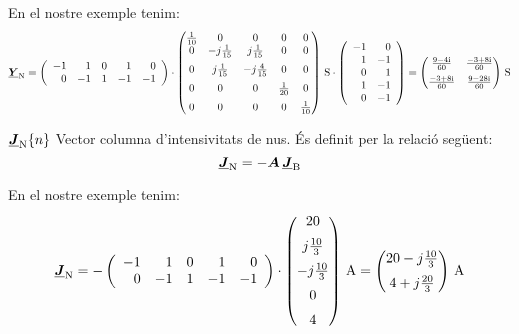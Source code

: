 \begin{list}{}
   En el nostre exemple tenim:
   {\fontsize{10pt}{10pt}\selectfont
   \[
      \mcmplx{Y}\ped{N} =
      \left(\begin{array}{rrrrr} -1 & 1  & 0 &  1 & 0 \\  0 & -1 & 1 & -1 & -1
      \end{array}\right) \cdot
      \begin{pmatrix}
            \frac{1}{10} & 0 & 0 & 0 & 0 \\
            0 & -j\frac{1}{15} & j\frac{1}{15} & 0 & 0 \\[2mm]
            0 & j\frac{1}{15} & -j\frac{4}{15} & 0 & 0 \\[2mm]
            0 & 0 & 0 & \frac{1}{20} & 0 \\[2mm]
            0 & 0 & 0 & 0 & \frac{1}{10}
      \end{pmatrix}\,\unit{S} \cdot
      \left(\begin{array}{rr} -1 & 0 \\ 1  & -1 \\  0 & 1 \\ 1 & -1 \\ 0 & -1
      \end{array}\right)
       =
      \begin{pmatrix}
            \frac{\complexnum{9 - j 4}}{60} & \frac{\complexnum{-3 + j 8}}{60} \\[2mm]
            \frac{\complexnum{-3 + j 8}}{60} & \frac{\complexnum{9 - j 28}}{60}
      \end{pmatrix}\,\unit{S}
      \label{eq:yn}
   \]}

   \item[$\underline{\boldsymbol{J}}_\mathrm{N}\{n\}$] Vector columna d'intensivitats de nus. És definit per la relació següent:
   \begin{equation}
      \underline{\boldsymbol{J}}_\mathrm{N} = - \boldsymbol{A} \,\underline{\boldsymbol{J}}_\mathrm{B}
   \end{equation}

   En el nostre exemple tenim:
   \[
      \mcmplx{J}\ped{N} = -
      \left(\begin{array}{rrrrr} -1 & 1  & 0 &  1 & 0 \\  0 & -1 & 1 & -1 & -1
      \end{array}\right) \cdot
      \begin{pmatrix}
            20 \\[2mm]
             j \frac{10}{3} \\[2mm]
             -j \frac{10}{3} \\[2mm]
             0 \\[2mm]
              4
      \end{pmatrix}\,\unit{A}
      =
      \begin{pmatrix}
            20 - j \frac{10}{3} \\[2mm]
            4 + j \frac{20}{3}
      \end{pmatrix}\unit{\,A}
   \]


\end{list}
